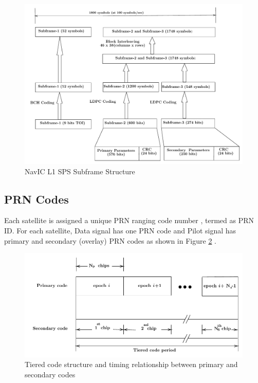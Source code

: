 \documentclass[conference]{IEEEtran}
\begin{document}
\begin{figure}[ht]
\centering
\includegraphics[width= 1\columnwidth]{figs/spsframe}
\centering
\caption{NavIC L1 SPS Subframe Structure}
\label{fig: SPS_Structure}
\end{figure}

\subsection{PRN Codes}
Each satellite is assigned a unique PRN ranging code number \cite{b2}, termed as PRN ID. For each satellite, Data signal 
has one PRN code and  Pilot signal has primary and secondary (overlay) PRN codes as shown in Figure \ref{fig:R0_IZ4} \cite{b2}.

\begin{figure}[ht]
    \centering
    \includegraphics[width=\columnwidth]{figs/tiered_code}
    \centering
    \caption{Tiered code structure and timing relationship between primary and secondary codes}
    \label{fig:R0_IZ4}
\end{figure}
\end{document}
